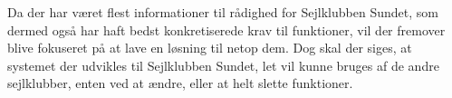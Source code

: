 Da der har været flest informationer til rådighed for Sejlklubben Sundet, som dermed også har haft bedst
konkretiserede krav til funktioner, vil der fremover blive fokuseret på at lave en løsning til netop dem. 
Dog skal der siges, at systemet der udvikles til Sejlklubben Sundet, let vil kunne bruges af de andre sejlklubber, enten ved at ændre, eller at helt slette funktioner.
